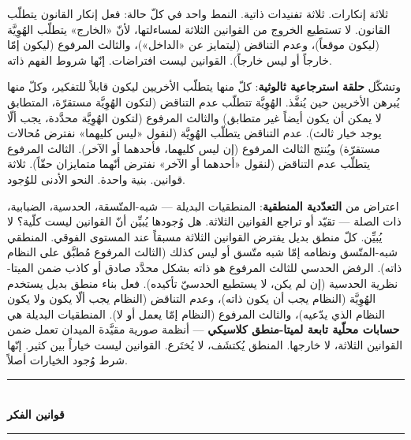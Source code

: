 \documentclass[10pt, openany, oneside]{book}
\renewcommand{\normalsize}{\fontsize{10}{13}\selectfont}
\begin{document}
\vspace{0.8em}

\noindent ثلاثة إنكارات. ثلاثة تفنيدات ذاتية. النمط واحد في كلّ حالة: فعل إنكار القانون يتطلّب القانون. لا تستطيع الخروج من القوانين الثلاثة لمساءلتها، لأنّ «الخارج» يتطلّب الهُوِيَّة (ليكون موقعاً)، وعدم التناقض (ليتمايز عن «الداخل»)، والثالث المرفوع (ليكون إمّا خارجاً أو ليس خارجاً). القوانين ليست افتراضات. إنّها شروط الفهم ذاته.

وتشكّل \textbf{حلقة استرجاعية ثالوثية}: كلّ منها يتطلّب الأخريين ليكون قابلاً للتفكير، وكلّ منها يُبرهن الأخريين حين يُنفَّذ. الهُوِيَّة تتطلّب عدم التناقض (لتكون الهُوِيَّة مستقرّة، المتطابق لا يمكن أن يكون أيضاً غير متطابق) والثالث المرفوع (لتكون الهُوِيَّة محدَّدة، يجب ألّا يوجد خيار ثالث). عدم التناقض يتطلّب الهُوِيَّة (لنقول «ليس كليهما» نفترض مُحالات مستقرّة) ويُنتج الثالث المرفوع (إن ليس كليهما، فأحدهما أو الآخر). الثالث المرفوع يتطلّب عدم التناقض (لنقول «أحدهما أو الآخر» نفترض أنّهما متمايزان حقّاً). ثلاثة قوانين. بنية واحدة. النحو الأدنى للوُجود.

اعتراض من \textbf{التعدّدية المنطقية}: المنطقيات البديلة --- شبه-المتّسقة، الحدسية، الضبابية، ذات الصلة --- تقيّد أو تراجع القوانين الثلاثة. هل وُجودها يُبيِّن أنّ القوانين ليست كلّية؟ لا يُبيِّن. كلّ منطق بديل يفترض القوانين الثلاثة مسبقاً عند المستوى الفوقي. المنطقي شبه-المتّسق ونظامه إمّا شبه متّسق أو ليس كذلك (الثالث المرفوع مُطبَّق على النظام ذاته). الرفض الحدسي للثالث المرفوع هو ذاته بشكل محدَّد صادق أو كاذب ضمن الميتا-نظرية الحدسية (إن لم يكن، لا يستطيع الحدسيّ تأكيده). فعل بناء منطق بديل يستخدم الهُوِيَّة (النظام يجب أن يكون ذاته)، وعدم التناقض (النظام يجب ألّا يكون ولا يكون النظام الذي يدّعيه)، والثالث المرفوع (النظام إمّا يعمل أو لا). المنطقيات البديلة هي \textbf{حسابات محلّية تابعة لميتا-منطق كلاسيكي} --- أنظمة صورية مقيَّدة الميدان تعمل ضمن القوانين الثلاثة، لا خارجها. المنطق يُكتشَف، لا يُختَرع. القوانين ليست خياراً بين كثير. إنّها شرط وُجود الخيارات أصلاً.


\begin{center}
    \rule{0.3\textwidth}{0.4pt}\\[0.5em]
    {\normalsize\bfseries قوانين الفكر}\\[0.3em]
    \rule{0.3\textwidth}{0.4pt}
\end{center}

\vspace{1em}
\end{document}
